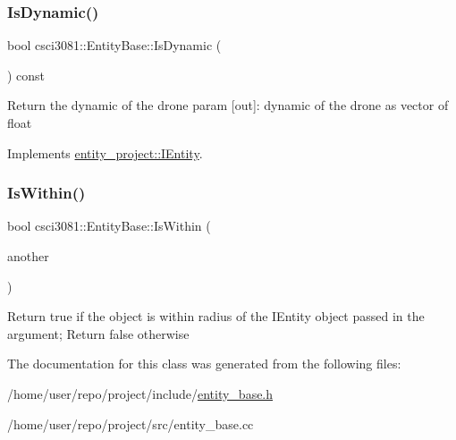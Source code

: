 \subsubsection{\texorpdfstring{Is\+Dynamic()}{IsDynamic()}}
{\footnotesize\ttfamily bool csci3081\+::\+Entity\+Base\+::\+Is\+Dynamic (\begin{DoxyParamCaption}{ }\end{DoxyParamCaption}) const\hspace{0.3cm}{\ttfamily [virtual]}}

Return the dynamic of the drone param \mbox{[}out\mbox{]}\+: dynamic of the drone as vector of float 

Implements \hyperlink{classentity__project_1_1IEntity_a58d710abd04e533123d033a7ba80f017}{entity\+\_\+project\+::\+I\+Entity}.

\mbox{\label{classcsci3081_1_1EntityBase_a7ed05da61dab982c517c3481941a4be8}} 
\subsubsection{\texorpdfstring{Is\+Within()}{IsWithin()}}
{\footnotesize\ttfamily bool csci3081\+::\+Entity\+Base\+::\+Is\+Within (\begin{DoxyParamCaption}\item[{\hyperlink{classentity__project_1_1IEntity}{I\+Entity} $\ast$}]{another }\end{DoxyParamCaption})}

Return true if the object is within radius of the I\+Entity object passed in the argument; Return false otherwise 

The documentation for this class was generated from the following files\+:\begin{DoxyCompactItemize}
\item 
/home/user/repo/project/include/\hyperlink{entity__base_8h}{entity\+\_\+base.\+h}\item 
/home/user/repo/project/src/entity\+\_\+base.\+cc\end{DoxyCompactItemize}
